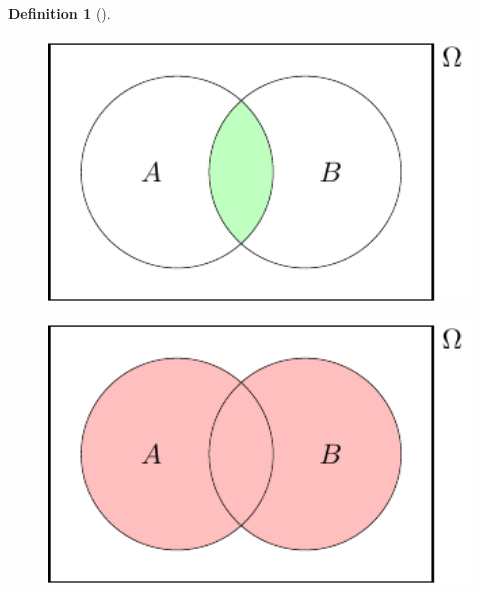 \documentclass[
  letterpaper,
]{report}
\theoremstyle{definition}
\newtheorem{definition}{Definition}[chapter]
\theoremstyle{definition}
\theoremstyle{remark}
\begin{document}
\begin{definition}[]
\begin{figure}
{}

\end{figure}

\begin{figure}

{\centering \includegraphics[width=7.63889in,height=\textheight]{sections/L03-events_files/figure-pdf/venn-and-1.pdf}

}

\end{figure}

\begin{figure}

{\centering \includegraphics[width=7.63889in,height=\textheight]{sections/L03-events_files/figure-pdf/venn-or-1.pdf}

}

\end{figure}

\end{definition}
\end{document}
